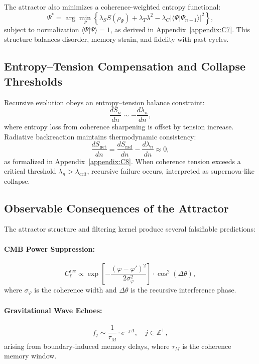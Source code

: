 The attractor also minimizes a coherence-weighted entropy functional:
\[
\Psi^* = \arg\min_{\Psi} \left\{ \lambda_S S(\rho_\Psi) + \lambda_T \lambda^2 - \lambda_C |\langle \Psi | \Psi_{n-1} \rangle|^2 \right\},
\]
subject to normalization \( \langle \Psi | \Psi \rangle = 1 \), as derived in Appendix~\ref{appendix:C7}. This structure balances disorder, memory strain, and fidelity with past cycles.

\subsection{Entropy–Tension Compensation and Collapse Thresholds}
\label{subsec:entropy-dynamics}

Recursive evolution obeys an entropy–tension balance constraint:
\[
\frac{dS_n}{dn} \sim -\frac{d\lambda_n}{dn},
\]
where entropy loss from coherence sharpening is offset by tension increase. Radiative backreaction maintains thermodynamic consistency:
\[
\frac{dS_{\text{net}}}{dn} = \frac{dS_{\text{rad}}}{dn} - \frac{d\lambda_n}{dn} \approx 0,
\]
as formalized in Appendix~\ref{appendix:C8}. When coherence tension exceeds a critical threshold \( \lambda_n > \lambda_{\text{crit}} \), recursive failure occurs, interpreted as supernova-like collapse.

\subsection{Observable Consequences of the Attractor}
\label{subsec:observables}

The attractor structure and filtering kernel produce several falsifiable predictions:

\paragraph{CMB Power Suppression:}
\[
C_\ell^{\text{rec}} \propto \exp\left[-\frac{(\varphi - \varphi')^2}{2\sigma_\varphi^2}\right] \cdot \cos^2(\Delta \theta),
\]
where \( \sigma_\varphi \) is the coherence width and \( \Delta \theta \) is the recursive interference phase.

\paragraph{Gravitational Wave Echoes:}
\[
f_j \sim \frac{1}{\tau_M} \cdot e^{-j \Delta}, \quad j \in \mathbb{Z}^+,
\]
arising from boundary-induced memory delays, where \( \tau_M \) is the coherence memory window.

